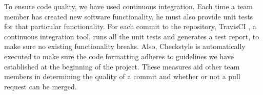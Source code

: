 To ensure code quality, we have used continuous integration. Each time a team member has created new software functionality, he must also provide unit tests for that particular functionality. For each commit to the repository, TravisCI \citep{travis}, a continuous integration tool, runs all the unit tests and generates a test report, to make sure no existing functionality breaks. Also, Checkstyle is automatically executed to make sure the code formatting adheres to guidelines we have established at the beginning of the project. These measures aid other team members in determining the quality of a commit and whether or not a pull request can be merged.